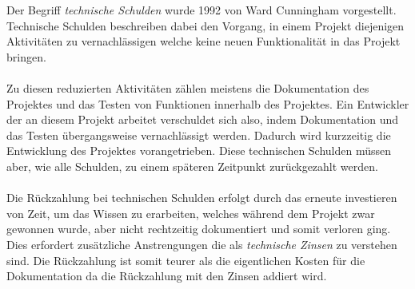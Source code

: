 \documentclass[a4paper,12pt,twoside]{scrartcl}
\begin{document}
Der Begriff \textit{technische Schulden} wurde 1992 von Ward Cunningham vorgestellt. Technische Schulden beschreiben dabei den Vorgang, in einem Projekt diejenigen Aktivitäten zu vernachlässigen welche keine neuen Funktionalität in das Projekt bringen. 
\\\\
Zu diesen reduzierten Aktivitäten zählen meistens die Dokumentation des Projektes und das Testen von Funktionen innerhalb des Projektes. Ein Entwickler der an diesem Projekt arbeitet verschuldet sich also, indem Dokumentation und das Testen übergangsweise vernachlässigt werden. Dadurch wird kurzzeitig die Entwicklung des Projektes vorangetrieben. Diese technischen Schulden müssen aber, wie alle Schulden, zu einem späteren Zeitpunkt zurückgezahlt werden. 
\\\\
Die Rückzahlung bei technischen Schulden erfolgt durch das erneute investieren von Zeit, um das Wissen zu erarbeiten, welches während dem Projekt zwar gewonnen wurde, aber nicht rechtzeitig dokumentiert und somit verloren ging. Dies erfordert zusätzliche Anstrengungen die als \textit{technische Zinsen} zu verstehen sind. Die Rückzahlung ist somit teurer als die eigentlichen Kosten für die Dokumentation da die Rückzahlung mit den Zinsen addiert wird.
\end{document}
